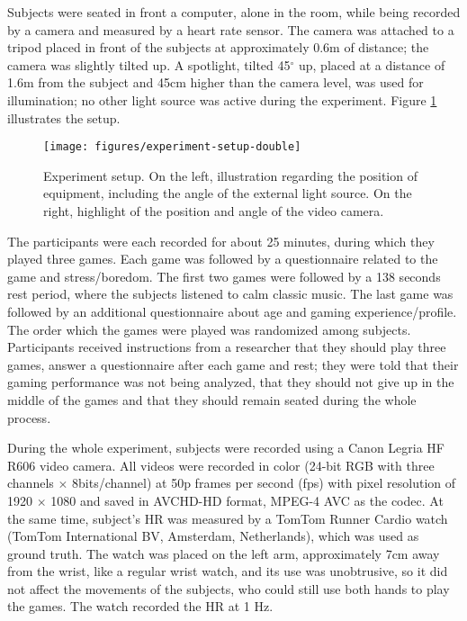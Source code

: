 Subjects were seated in front a computer, alone in the room, while being recorded by a camera and measured by a heart rate sensor. The camera was attached to a tripod placed in front of the subjects at approximately 0.6m of distance; the camera was slightly tilted up. A spotlight, tilted 45$^{\circ}$ up, placed at a distance of 1.6m from the subject and 45cm higher than the camera level, was used for illumination; no other light source was active during the experiment. Figure \ref{fig:setup} illustrates the setup.

\begin{figure}
\centering
\texttt{[image: figures/experiment-setup-double]}
\caption{Experiment setup. On the left, illustration regarding the position of equipment, including the angle of the external light source. On the right, highlight of the position and angle of the video camera.}
\label{fig:setup}
\end{figure}

The participants were each recorded for about 25 minutes, during which they played three games. Each game was followed by a questionnaire related to the game and stress/boredom. The first two games were followed by a 138 seconds rest period, where the subjects listened to calm classic music. The last game was followed by an additional questionnaire about age and gaming experience/profile. The order which the games were played was randomized among subjects. Participants received instructions from a researcher that they should play three games, answer a questionnaire after each game and rest; they were told that their gaming performance was not being analyzed, that they should not give up in the middle of the games and that they should remain seated during the whole process.

During the whole experiment, subjects were recorded using a Canon Legria HF R606 video camera. All videos were recorded in color (24-bit RGB with three channels $\times$ 8bits/channel) at 50p frames per second (fps) with pixel resolution of 1920 $\times$ 1080 and saved in AVCHD-HD format, MPEG-4 AVC as the codec. At the same time, subject's HR was measured by a TomTom Runner Cardio watch (TomTom International BV, Amsterdam, Netherlands), which was used as ground truth. The watch was placed on the left arm, approximately 7cm away from the wrist, like a regular wrist watch, and its use was unobtrusive, so it did not affect the movements of the subjects, who could still use both hands to play the games. The watch recorded the HR at 1 Hz.

